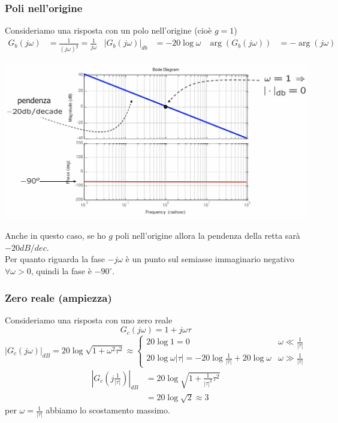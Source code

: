 \documentclass{article}
\numberwithin{equation}{subsection}
\begin{document}
\subsubsection{Poli nell'origine}
Consideriamo una risposta con un polo nell'origine (cioè $g=1$)
\begin{align*}
    G_b(j\omega) &= \frac{1}{(j\omega)^g} = \frac{1}{j\omega} & |G_b(j\omega)|_{db} &= -20 \log \omega & \arg(G_b(j \omega)) &= -\arg(j\omega)
\end{align*}
\begin{center}
    \includegraphics[scale=0.125]{Images/Diagramma_poli_origine.png}
\end{center}
Anche in questo caso, se ho $g$ poli nell'origine allora la pendenza della retta sarà $-20  dB/dec$.\\
Per quanto riguarda la fase $-j \omega$ è un punto sul semiasse immaginario negativo $\forall \omega>0$, quindi la fase è $-90^\circ$.



\subsubsection{Zero reale (ampiezza)}
Consideriamo una risposta con uno zero reale
\[
    G_c(j\omega) = 1 + j \omega \tau  
\]
\[
    |G_c(j\omega)|_{dB} = 20 \log \sqrt{1 + \omega^2\tau^2} \approx
    \begin{cases}
        20 \log 1 = 0 &\omega \ll \frac{1}{|\tau|}\\
        20 \log \omega |\tau| = -20 \log \frac{1}{|\tau|} + 20 \log \omega &\omega \gg \frac{1}{|\tau|}
    \end{cases}
\]
\begin{align*}
    |G_c\left(j \frac{1}{|\tau|} \right)|_{dB} &= 20 \log \sqrt{1+\frac{1}{|\tau|^2}\tau^2}\\
    &= 20 \log \sqrt{2} \approx 3
\end{align*}
per $\omega = \frac{1}{|\tau|}$ abbiamo lo scostamento massimo.
\end{document}
